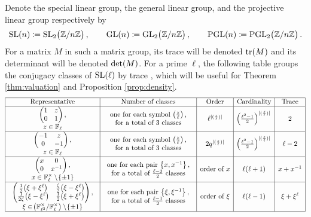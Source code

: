 \documentclass{article}
\theoremstyle{plain}
\theoremstyle{definition}
\newcommand{\FF}{\mathbb{F}}
\newcommand{\GL}{\operatorname{GL}}
\newcommand{\PGL}{\operatorname{PGL}}
\newcommand{\SL}{\operatorname{SL}}
\newcommand{\tr}{\operatorname{tr}}
\newcommand{\ZZ}{\mathbb{Z}}
\newcommand{\br}{\!\del}
\newcommand{\twobytwo}[4]{\begin{pmatrix} #1 & #2 \\ #3 & #4 \end{pmatrix}}
\begin{document}
Denote the special linear group, the general linear group, and the projective linear group respectively by
$$ \SL\br{n} \coloneqq \SL_2\br{\ZZ / n\ZZ}, \qquad \GL\br{n} \coloneqq \GL_2\br{\ZZ / n\ZZ}, \qquad \PGL\br{n} \coloneqq \PGL_2\br{\ZZ / n\ZZ}. $$
For a matrix $ M $ in such a matrix group, its trace will be denoted $ \tr\br{M} $ and its determinant will be denoted $ \det\br{M} $. For a prime $ \ell $, the following table groups the conjugacy classes of $ \SL\br{\ell} $ by trace \cite[Table 1.1 and Exercise 1.4]{Bon11}, which will be useful for Theorem \ref{thm:valuation} and Proposition \ref{prop:density}.
$$
\begin{array}{|c|c|c|c|c|}
\hline
\text{Representative} & \text{Number of classes} & \text{Order} & \text{Cardinality} & \text{Trace} \\
\hline
\begin{array}{c} \twobytwo{1}{z}{0}{1}, \\ z \in \FF_\ell \end{array} & \begin{array}{c} \text{one for each symbol} \ \br{\tfrac{z}{\ell}}, \\ \text{for a total of} \ 3 \ \text{classes} \end{array} & \ell^{|(\frac{z}{\ell})|} & \br{\tfrac{\ell^2 - 1}{2}}^{|(\frac{z}{\ell})|} & 2 \\
\hline
\begin{array}{c} \twobytwo{-1}{z}{0}{-1}, \\ z \in \FF_\ell \end{array} & \begin{array}{c} \text{one for each symbol} \ \br{\tfrac{z}{\ell}}, \\ \text{for a total of} \ 3 \ \text{classes} \end{array} & 2q^{|(\frac{z}{\ell})|} & \br{\tfrac{\ell^2 - 1}{2}}^{|(\frac{z}{\ell})|} & \ell - 2 \\
\hline
\begin{array}{c} \twobytwo{x}{0}{0}{x^{-1}}, \\ x \in \FF_\ell^\times \setminus \cbr{\pm1} \end{array} &
\begin{array}{c} \text{one for each pair} \ \cbr{x, x^{-1}}, \\ \text{for a total of} \ \tfrac{\ell - 3}{2} \ \text{classes} \end{array} & \text{order of} \ x & \ell\br{\ell + 1} & x + x^{-1} \\
\hline
\begin{array}{c} \twobytwo{\tfrac{1}{2}\br{\xi + \xi^\ell}}{\tfrac{\zeta}{2}\br{\xi - \xi^\ell}}{\tfrac{1}{2\zeta}\br{\xi - \xi^\ell}}{\tfrac{1}{2}\br{\xi + \xi^\ell}}, \\ \xi \in \br[1]{\FF_{\ell^2}^\times / \FF_\ell^\times} \setminus \cbr{\pm1} \end{array} & \begin{array}{c} \text{one for each pair} \ \cbr{\xi, \xi^{-1}}, \\ \text{for a total of} \ \tfrac{\ell - 1}{2} \ \text{classes} \end{array} & \text{order of} \ \xi & \ell\br{\ell - 1} & \xi + \xi^\ell \\
\hline
\end{array}
$$
\end{document}
